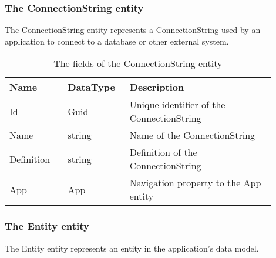 \subsubsection{The ConnectionString entity}

The ConnectionString entity represents a ConnectionString used by an application to
connect to a database or other external system.

\begin{table}[H]
\small
\begin{tabular}{ p{0.20\linewidth} p{0.20\linewidth} p{0.50\linewidth} }
\hline
\textbf{Name} & \textbf{DataType} & \textbf{Description} \\
\hline
Id & Guid & Unique identifier of the ConnectionString \\
Name & string & Name of the ConnectionString \\
Definition & string & Definition of the ConnectionString \\
App & App & Navigation property to the App entity \\
\hline
\end{tabular}
\caption{The fields of the ConnectionString entity}
\label{table:connectionstring_entity}
\end{table}

\subsubsection{The Entity entity}

The Entity entity represents an entity in the application's data model. 

